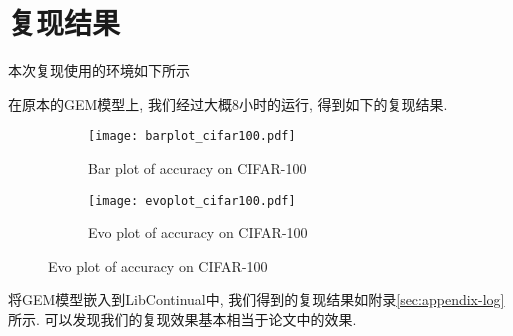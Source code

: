 \section{复现结果}
\noindent 本次复现使用的环境如下所示

\scalebox{0.8}{}
\scalebox{0.9}{}





在原本的GEM模型上, 我们经过大概8小时的运行, 得到如下的复现结果.
\begin{figure}[H]
    \centering
    \begin{subfigure}{0.45\textwidth}{
        \texttt{[image: barplot\_cifar100.pdf]}
        \caption{Bar plot of accuracy on CIFAR-100}
        \label{fig:barplot}
    }
    \end{subfigure}
    \begin{subfigure}{0.45\textwidth}{
        \texttt{[image: evoplot\_cifar100.pdf]}
        \caption{Evo plot of accuracy on CIFAR-100}
        \label{fig:evoplot}
    }
    \end{subfigure}
\end{figure}


将GEM模型嵌入到LibContinual中, 我们得到的复现结果如附录\ref{sec:appendix-log}所示. 可以发现我们的复现效果基本相当于论文中的效果.